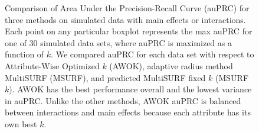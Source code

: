 \documentclass[10pt,letterpaper]{article}
\begin{document}
\begin{figure}[!bht]
	\caption{Comparison of Area Under the Precision-Recall Curve (auPRC) for three methods on simulated data with main effects or interactions. Each point on any particular boxplot represents the max auPRC for one of 30 simulated data sets, where auPRC is maximized as a function of $k$. We compared auPRC for each data set with respect to Attribute-Wise Optimized $k$ (AWOK), adaptive radius method MultiSURF (MSURF), and predicted MultiSURF fixed $k$ (MSURF $k$). AWOK has the best performance overall and the lowest variance in auPRC. Unlike the other methods, AWOK auPRC is balanced between interactions and main effects because each attribute has its own best $k$.}\label{fig:auPRC-compare-vwok-msurf-predk}
\end{figure}
\end{document}
